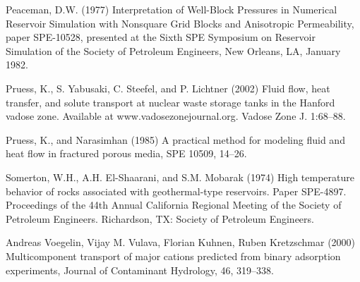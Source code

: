 \begin{description}
\item Peaceman, D.W. (1977) Interpretation of Well-Block Pressures in Numerical Reservoir Simulation with Nonsquare Grid Blocks and Anisotropic Permeability, paper SPE-10528, presented at the Sixth SPE Symposium on Reservoir Simulation of the Society of Petroleum Engineers, New Orleans, LA, January 1982.  

\item Pruess, K., S. Yabusaki, C. Steefel, and P. Lichtner (2002) Fluid flow,
heat transfer, and solute transport at nuclear waste storage tanks in the Hanford vadose zone. Available at www.vadosezonejournal.org. Vadose Zone J. 1:68--88.

\item Pruess, K., and Narasimhan (1985) A practical method for modeling fluid and heat flow in fractured porous media, SPE 10509, 14--26.

\item Somerton, W.H., A.H. El-Shaarani, and S.M. Mobarak (1974) 
High temperature behavior of rocks associated with geothermal-type reservoirs. Paper SPE-4897. Proceedings of the 44th Annual 
California Regional Meeting of the Society of Petroleum Engineers. Richardson, TX: Society of Petroleum Engineers. 

\item Andreas Voegelin, Vijay M. Vulava, Florian Kuhnen, Ruben Kretzschmar (2000) Multicomponent transport of major cations predicted from binary adsorption experiments, Journal of Contaminant Hydrology, 46, 319--338.
\end{description}
